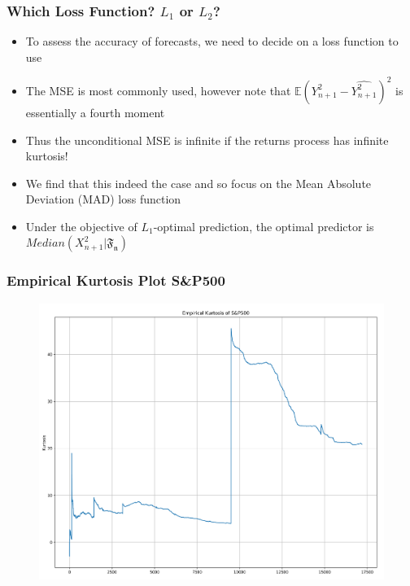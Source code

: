 \documentclass{beamer}
\begin{document}
\begin{frame}
\frametitle{Which Loss Function? $L_1$ or $L_2$?}
\begin{itemize}
\item{To assess the accuracy of forecasts, we need to decide on a loss function to use}
\vspace{3pt}
\item{The MSE is most commonly used, however note that $\mathbb{E}(Y_{n+1}^{2}-\widehat{Y_{n+1}^2})^2$ is essentially a fourth moment}
\vspace{3pt}
\item{Thus the unconditional MSE is infinite if the returns process has infinite kurtosis!}
\vspace{3pt}
\item{We find that this indeed the case and so focus on the Mean Absolute Deviation (MAD) loss function}
\vspace{3pt}
\item{Under the objective of $L_1$-optimal prediction, the optimal predictor is $Median(X_{n+1}^2|\mathfrak{F_n})$}
\end{itemize}
\end{frame}

\begin{frame}
\frametitle{Empirical Kurtosis Plot S\&P500}
\begin{figure}[h!]
\includegraphics[width=\textwidth]{sp500_returns_kurtosis.png}
\end{figure}
\end{frame}
\end{document}
